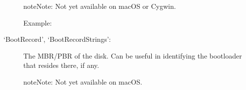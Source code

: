 \documentclass[letterpaper,10pt,english]{sphinxmanual}
\begin{document}
\begin{description}
\begin{sphinxadmonition}{note}{Note:}
Not yet available on macOS or Cygwin.
\end{sphinxadmonition}
\begin{description}
\item[{Example:}] \leavevmode
\begin{sphinxVerbatim}[commandchars=\\\{\}]
\PYG{p}{[}\PYG{p}{]}\PYG{p}{[}\PYG{p}{]}
\end{sphinxVerbatim}

\end{description}

\item[{‘BootRecord’, ‘BootRecordStrings’:}] \leavevmode
The MBR/PBR of the disk. Can be useful in identifying the bootloader that
resides there, if any.

\begin{sphinxadmonition}{note}{Note:}
Not yet available on macOS.
\end{sphinxadmonition}

\end{description}
\end{document}
